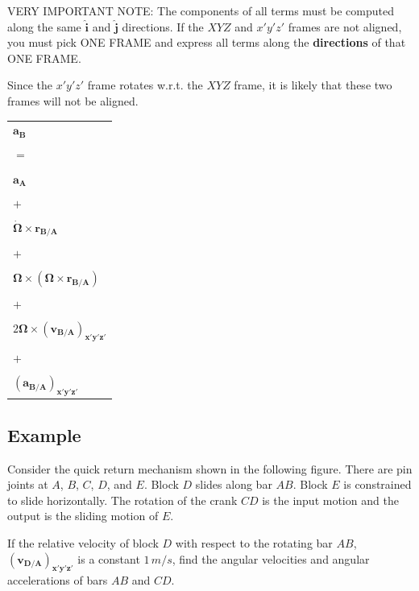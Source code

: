 \documentclass[12pt,letterpaper,twoside]{report}
\begin{document}
\vspace*{24\baselineskip}

VERY IMPORTANT NOTE: The components of all terms must be computed along the same $\bm{\hat{i}}$ and  $\bm{\hat{j}}$ directions. If the $XYZ$ and $x'y'z'$ frames are not aligned, you must pick ONE FRAME and express all terms along the \textbf{directions} of that ONE FRAME. 

Since the $x'y'z'$ frame rotates w.r.t. the $XYZ$ frame, it is likely that these two frames will not be aligned.  

\begin{center}
\begin{tabu} to 1\textwidth {  X[l]  }
$\bm{a_B}$\\
\\
$=$\\
\\
$\bm{a_A}$\\
\\
$+$\\
\\
$\bm{\dot{\Omega}} \times \bm{r_{B/A}}$\\
\\
$+$\\
\\
$\bm{\Omega} \times (\bm{\Omega} \times \bm{r_{B/A}})$\\
\\
$+$\\
\\
$2\bm{\Omega} \times \bm{(v_{B/A})_{x'y'z'}}$\\
\\
$+$\\
\\
$\bm{(a_{B/A})_{x'y'z'}}$\\
\end{tabu}
\end{center}

\subsection{Example}
Consider the quick return mechanism shown in the following figure. There are pin joints at $A$, $B$, $C$, $D$, and $E$.  Block $D$ slides along bar $AB$.  Block $E$ is constrained to slide horizontally.  The rotation of the crank $CD$ is the input motion and the output is the sliding motion of $E$. 

If the relative velocity of block $D$ with respect to the rotating bar $AB$, $\bm{(v_{D/A})_{x'y'z'}}$ is a constant $1 \, m/s$, find the angular velocities and angular accelerations of bars $AB$ and $CD$.  
\end{document}
